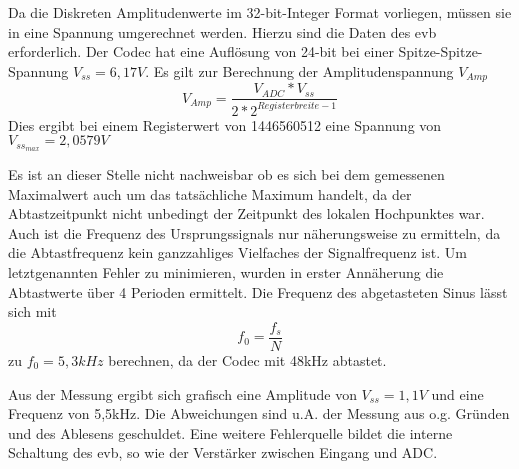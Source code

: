 Da die Diskreten Amplitudenwerte im 32-bit-Integer Format vorliegen, müssen sie in eine Spannung umgerechnet werden. Hierzu sind die Daten des \gls{evb} erforderlich.
Der Codec hat eine Auflösung von 24-bit bei einer Spitze-Spitze-Spannung \begin{math}V_{ss}=6,17V\end{math}. \pagebreak
Es gilt zur Berechnung der Amplitudenspannung \begin{math}V_{Amp}\end{math}
\begin{equation}\label{umrechnungRegisterzuSpannung}
  V_{Amp}=\frac{V_{ADC}*V_{ss}}{2*2^{Registerbreite-1}}
\end{equation} 
Dies ergibt bei einem Registerwert von 1446560512 eine Spannung von 
\begin{math}V_{ss_{max}}=2,0579V\end{math}\\\par
Es ist an dieser Stelle nicht nachweisbar ob es sich bei dem gemessenen Maximalwert auch um das tatsächliche Maximum handelt, 
da der Abtastzeitpunkt nicht unbedingt der Zeitpunkt des lokalen Hochpunktes war.
Auch ist die Frequenz des Ursprungssignals nur näherungsweise zu ermitteln, da die Abtastfrequenz kein ganzzahliges Vielfaches der Signalfrequenz ist. 
Um letztgenannten Fehler zu minimieren, wurden in erster Annäherung die Abtastwerte über 4 Perioden ermittelt.
Die Frequenz des abgetasteten Sinus lässt sich mit
\begin{equation}\label{freqAbgetastetesSignal}
 f_0=\frac{f_s}N 
\end{equation}  
zu \begin{math}f_0 = 5,3kHz\end{math} berechnen, da der Codec mit 48kHz 
abtastet.\\\par
Aus der Messung ergibt sich grafisch eine Amplitude von \begin{math}V_{ss}=1,1V\end{math} und eine Frequenz von 5,5kHz. 
Die Abweichungen sind u.A. der Messung aus o.g. Gründen und des Ablesens geschuldet. 
Eine weitere Fehlerquelle bildet die interne Schaltung des \gls{evb}, so wie der Verstärker zwischen Eingang und ADC.

